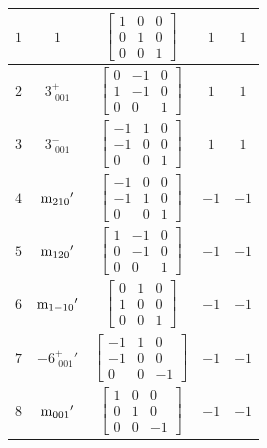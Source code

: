 \documentclass[fleqn,8pt]{jsarticle}
\begin{document}
\begin{longtable}{ccccc}
$ 1 $ & $ 1 $ & $ \begin{bmatrix} 1 & 0 & 0 \\ 0 & 1 & 0 \\ 0 & 0 & 1 \end{bmatrix} $ & $ 1 $ & $ 1 $ \\ \hline
$ 2 $ & $ 3^{+}_{\,\,001} $ & $ \begin{bmatrix} 0 & -1 & 0 \\ 1 & -1 & 0 \\ 0 & 0 & 1 \end{bmatrix} $ & $ 1 $ & $ 1 $ \\ \hline
$ 3 $ & $ 3^{-}_{\,\,001} $ & $ \begin{bmatrix} -1 & 1 & 0 \\ -1 & 0 & 0 \\ 0 & 0 & 1 \end{bmatrix} $ & $ 1 $ & $ 1 $ \\ \hline
$ 4 $ & $ {\rm m}_{210}{}' $ & $ \begin{bmatrix} -1 & 0 & 0 \\ -1 & 1 & 0 \\ 0 & 0 & 1 \end{bmatrix} $ & $ -1 $ & $ -1 $ \\ \hline
$ 5 $ & $ {\rm m}_{120}{}' $ & $ \begin{bmatrix} 1 & -1 & 0 \\ 0 & -1 & 0 \\ 0 & 0 & 1 \end{bmatrix} $ & $ -1 $ & $ -1 $ \\ \hline
$ 6 $ & $ {\rm m}_{1-10}{}' $ & $ \begin{bmatrix} 0 & 1 & 0 \\ 1 & 0 & 0 \\ 0 & 0 & 1 \end{bmatrix} $ & $ -1 $ & $ -1 $ \\ \hline
$ 7 $ & $ -6^{+}_{\,\,001}{}' $ & $ \begin{bmatrix} -1 & 1 & 0 \\ -1 & 0 & 0 \\ 0 & 0 & -1 \end{bmatrix} $ & $ -1 $ & $ -1 $ \\ \hline
$ 8 $ & $ {\rm m}_{001}{}' $ & $ \begin{bmatrix} 1 & 0 & 0 \\ 0 & 1 & 0 \\ 0 & 0 & -1 \end{bmatrix} $ & $ -1 $ & $ -1 $ \\ \hline

\end{longtable}
\end{document}
